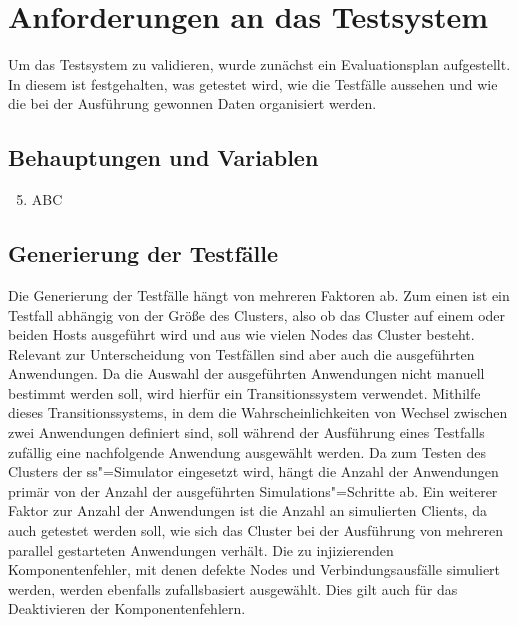 \section{Anforderungen an das Testsystem}
\label{sec:evaluationPlan}

Um das Testsystem zu validieren, wurde zunächst ein Evaluationsplan aufgestellt.
In diesem ist festgehalten, was getestet wird, wie die Testfälle aussehen und wie die bei der Ausführung gewonnen Daten organisiert werden.

\subsection{Behauptungen und Variablen}
\label{sec:predictions}

\begin{enumerate}
    \setcounter{enumi}{4}
    \item ABC
\end{enumerate}


\subsection{Generierung der Testfälle}
\label{sec:testcaseGeneration}

Die Generierung der Testfälle hängt von mehreren Faktoren ab.
Zum einen ist ein Testfall abhängig von der Größe des Clusters, also ob das Cluster auf einem oder beiden Hosts ausgeführt wird und aus wie vielen Nodes das Cluster besteht.
Relevant zur Unterscheidung von Testfällen sind aber auch die ausgeführten Anwendungen.
Da die Auswahl der ausgeführten Anwendungen nicht manuell bestimmt werden soll, wird hierfür ein Transitionssystem verwendet.
Mithilfe dieses Transitionssystems, in dem die Wahrscheinlichkeiten von Wechsel zwischen zwei Anwendungen definiert sind, soll während der Ausführung eines Testfalls zufällig eine nachfolgende Anwendung ausgewählt werden.
Da zum Testen des Clusters der \ac{ss}"=Simulator eingesetzt wird, hängt die Anzahl der Anwendungen primär von der Anzahl der ausgeführten Simulations"=Schritte ab.
Ein weiterer Faktor zur Anzahl der Anwendungen ist die Anzahl an simulierten Clients, da auch getestet werden soll, wie sich das Cluster bei der Ausführung von mehreren parallel gestarteten Anwendungen verhält.
Die zu injizierenden Komponentenfehler, mit denen defekte Nodes und Verbindungsausfälle simuliert werden, werden ebenfalls zufallsbasiert ausgewählt.
Dies gilt auch für das Deaktivieren der Komponentenfehlern.

